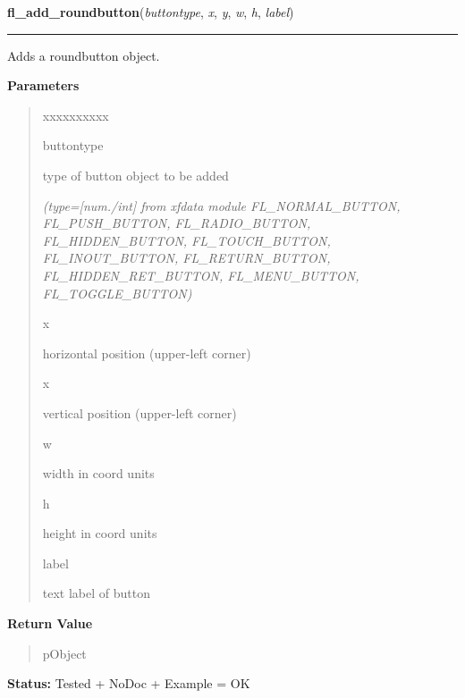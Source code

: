 \hspace{.8\funcindent}\begin{boxedminipage}{\funcwidth}

    \raggedright \textbf{fl\_add\_roundbutton}(\textit{buttontype}, \textit{x}, \textit{y}, \textit{w}, \textit{h}, \textit{label})

    \vspace{-1.5ex}

    \rule{\textwidth}{0.5\fboxrule}
\setlength{\parskip}{2ex}
    Adds a roundbutton object.

\setlength{\parskip}{1ex}
      \textbf{Parameters}
      \vspace{-1ex}

      \begin{quote}
        \begin{Ventry}{xxxxxxxxxx}

          \item[buttontype]

          type of button object to be added

            {\it (type=[num./int] from xfdata module FL\_NORMAL\_BUTTON, FL\_PUSH\_BUTTON, 
FL\_RADIO\_BUTTON, FL\_HIDDEN\_BUTTON, FL\_TOUCH\_BUTTON, 
FL\_INOUT\_BUTTON, FL\_RETURN\_BUTTON, FL\_HIDDEN\_RET\_BUTTON, 
FL\_MENU\_BUTTON, FL\_TOGGLE\_BUTTON)}

          \item[x]

          horizontal position (upper-left corner)

          \item[x]

          vertical position (upper-left corner)

          \item[w]

          width in coord units

          \item[h]

          height in coord units

          \item[label]

          text label of button

        \end{Ventry}

      \end{quote}

      \textbf{Return Value}
    \vspace{-1ex}

      \begin{quote}
      pObject

      \end{quote}

\textbf{Status:} Tested + NoDoc + Example = OK



    \end{boxedminipage}

